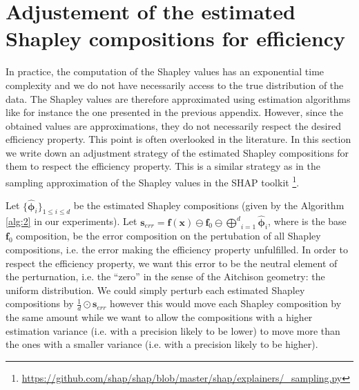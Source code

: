 \documentclass{article}
\theoremstyle{plain}
\theoremstyle{definition}
\theoremstyle{remark}
\begin{document}
\newpage
\section{Adjustement of the estimated Shapley compositions for efficiency}
\label{app:correct}

In practice, the computation of the Shapley values has an exponential time complexity and we do not have necessarily access to the true distribution of the data. The Shapley values are therefore approximated using estimation algorithms like for instance the one presented in the previous appendix. However, since the obtained values are approximations, they do not necessarily respect the desired efficiency property. This point is often overlooked in the literature. In this section we write down an adjustment strategy of the estimated Shapley compositions for them to respect the efficiency property. This is a similar strategy as in the sampling approximation of the Shapley values in the SHAP toolkit \cite{NIPS2017_7062}\footnote{\url{https://github.com/shap/shap/blob/master/shap/explainers/_sampling.py}}.

Let $\{\hat{\bm{\phi}}_i\}_{1\leq i \leq d}$ be the estimated Shapley compositions (given by the Algorithm \ref{alg:2} in our experiments). Let $\displaystyle \bm{s}_{err} = \bm{f}(\bm{x}) \ominus \bm{f}_0 \ominus \underset{i=1}{\overset{d}\bigoplus} \hat{\bm{\phi}}_i$, where is the base $\bm{f}_0$ composition, be the error composition on the pertubation of all Shapley compositions, i.e. the error making the efficiency property unfulfilled. In order to respect the efficiency property, we want this error to be the neutral element of the perturnation, i.e. the ``zero'' in the sense of the Aitchison geometry: the uniform distribution. We could simply perturb each estimated Shapley compositions by $\frac{1}{d}\odot\bm{s}_{err}$ however this would move each Shapley composition by the same amount while we want to allow the compositions with a higher estimation variance (i.e. with a precision likely to be lower) to move more than the ones with a smaller variance (i.e. with a precision likely to be higher).
\end{document}
